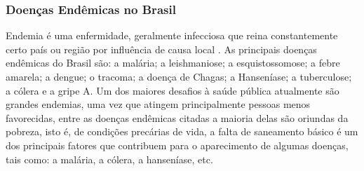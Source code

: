 \documentclass[conference]{IEEEtran}
\begin{document}
\subsubsection{Doenças Endêmicas no Brasil}

 Endemia é uma enfermidade, geralmente infecciosa que reina constantemente certo país ou região por influência de causa local \cite{brasil2001controle6}.
	As principais doenças endêmicas do Brasil são: a malária; a leishmaniose; a esquistossomose; a febre amarela; a dengue;  o tracoma; a doença de Chagas; a Hanseníase; a tuberculose; a cólera e a gripe A.
Um dos maiores desafios à saúde pública atualmente são grandes endemias, uma vez que atingem principalmente pessoas menos favorecidas, entre as doenças endêmicas citadas a maioria delas são oriundas da pobreza, isto é, de condições precárias de vida, a falta de saneamento básico é um dos principais fatores que contribuem para o aparecimento de algumas doenças, tais como: a malária, a cólera, a hanseníase, etc.
\end{document}

